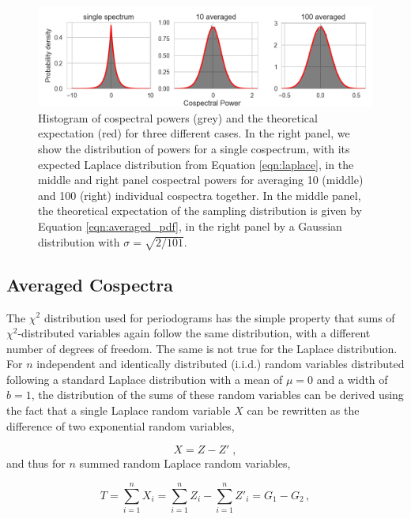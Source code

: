 \documentclass[12pt]{emulateapj}
\begin{document}
\begin{figure}
\begin{center}
\includegraphics[width=\textwidth]{../figs/avg_dist.png}
\caption{Histogram of cospectral powers (grey) and the theoretical expectation (red) for three different cases. In the right panel, we show the distribution of powers for a single cospectrum, with its expected Laplace distribution from Equation \ref{eqn:laplace}, in the middle and right panel cospectral powers for averaging 10 (middle) and 100 (right) individual cospectra together. In the middle panel, the theoretical expectation of the sampling distribution is given by Equation \ref{eqn:averaged_pdf}, in the right panel by a Gaussian distribution with $\sigma=\sqrt{2/101}$.}
\label{fig:avg_dist}
\end{center}
\end{figure}


\subsection{Averaged Cospectra}
\label{sec:averaged_cospectra}

The $\chi^2$ distribution used for periodograms has the simple property that sums of $\chi^2$-distributed variables again follow the same distribution, with a different number of degrees of freedom. The same is not true for the Laplace distribution. For $n$ independent and identically distributed (i.i.d.) random variables distributed following a standard Laplace distribution with a mean of $\mu = 0$ and a width of $b = 1$, the distribution of the sums of these random variables can be derived using the fact that a single Laplace random variable $X$ can be rewritten as the difference of two exponential random variables, 

\[
X = Z - Z' \; ,
\]
\noindent and thus for $n$ summed random Laplace random variables,

\begin{equation}
T = \sum_{i=1}^{n} X_i = \sum_{i=1}^{n}Z_i - \sum_{i=1}^{n} Z'_i = G_1 - G_2 \, ,
\end{equation}
\end{document}
